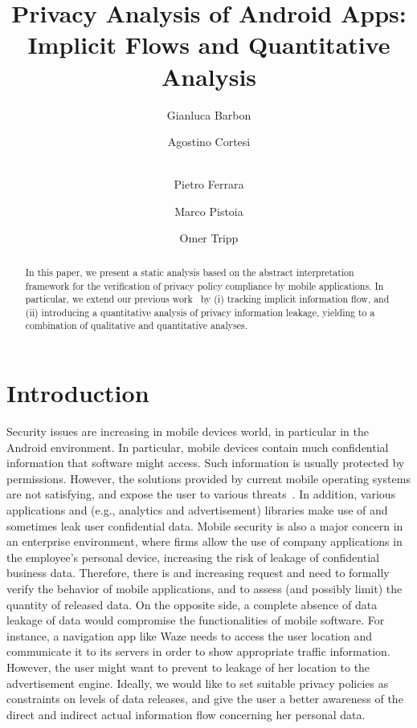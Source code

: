 \documentclass{llncs}
\begin{document}
\mainmatter

\title{Privacy Analysis of Android Apps:\\ Implicit Flows and Quantitative Analysis}



\author{ Gianluca Barbon  \and Agostino Cortesi \and  \\ Pietro Ferrara \and Marco Pistoia \and Omer Tripp}



\maketitle


\begin{abstract}
In this paper, we present a static analysis based on the abstract interpretation framework for the verification of privacy policy compliance by mobile applications. In particular, we extend our previous work~\cite{Cortesi15} by (i) tracking implicit information flow, and (ii) introducing a quantitative analysis of privacy information leakage, yielding to a combination of qualitative and quantitative analyses.
\end{abstract}



\section{Introduction}
Security issues are increasing in mobile devices world, in particular in the Android environment. In particular, mobile devices contain much confidential information that software might access. Such information is usually protected by permissions. However, the solutions provided by current mobile operating systems are not satisfying, and expose the user to various threats~\cite{Enck:2014:TIT:2642648.2619091}. In addition, various applications and (e.g., analytics and advertisement) libraries make use of and sometimes leak user confidential data. Mobile security is also a major concern in an enterprise environment, where firms allow the use of company applications in  the employee's personal device, increasing the risk of leakage of confidential business data. Therefore, there is and increasing request and need to formally verify the behavior of mobile applications, and to assess (and possibly limit) the quantity of released data. 
On the opposite side, a complete absence of data leakage of data would compromise the functionalities of mobile software. For instance, a navigation app like Waze needs to access the user location and communicate it to its servers in order to show appropriate traffic information. However, the user might want to prevent to leakage of her location to the advertisement engine.
Ideally, we would like to set suitable privacy policies as constraints on levels of data releases, and give the user a better awareness of the direct and indirect actual information flow concerning her personal data.
\end{document}
